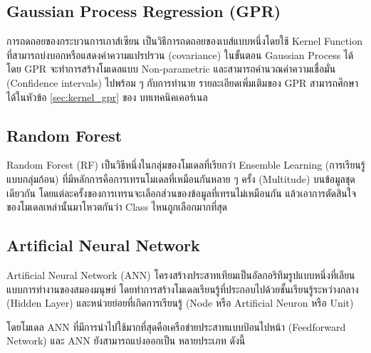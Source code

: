 \subsection{Gaussian Process Regression (GPR)}
\label{sec:gpr}

การถดถอยของกระบวนการเกาส์เซียน เป็นวิธีการถดถอยของเบส์แบบหนึ่งโดยใช้ Kernel Function ที่สามารถบ่งบอกหรือแสดงค่าความแปรปรวน (covariance) 
ในขั้นตอน Gaussian Process ได้\cite{rasmussen2005} โดย GPR จะทำการสร้างโมเดลแบบ Non-parametric และสามารถคำนวณค่าความเชื่อมั่น 
(Confidence intervals) ไปพร้อม ๆ กับการทำนาย รายละเอียดเพิ่มเติมของ GPR สามารถศึกษาได้ในหัวข้อ \ref{sec:kernel_gpr} ของ%
บทเทคนิคเคอร์เนล

\subsection{Random Forest}
\label{sec:rs}

Random Forest (RF) เป็นวิธีหนึ่งในกลุ่มของโมเดลที่เรียกว่า Ensemble Learning (การเรียนรู้แบบกลุ่มก้อน) 
ที่มีหลักการคือการเทรนโมเดลที่เหมือนกันหลาย ๆ ครั้ง (Multitude) บนข้อมูลชุดเดียวกัน โดยแต่ละครั้งของการเทรนจะเลือกส่วนของข้อมูลที่เทรนไม่เหมือนกัน 
แล้วเอาการตัดสินใจของโมเดลเหล่านั้นมาโหวตกันว่า Class ไหนถูกเลือกมากที่สุด\cite{breiman2001,quinlan1986}

\subsection{Artificial Neural Network}
\label{sec:ann}

Artificial Neural Network (ANN) โครงสร้างประสาทเทียมเป็นอัลกอริทึมรูปแบบหนึ่งที่เลียนแบบการทำงานของสมองมนุษย์
โดยทำการสร้างโมเดลเรียนรู้ที่ประกอบไปด้วยชั้นเรียนรู้ระหว่างกลาง (Hidden Layer) และหน่วยย่อยที่เกิดการเรียนรู้ (Node หรือ Artificial Neuron หรือ Unit)

โดยโมเดล ANN ที่มีการนำไปใช้มากที่สุดคือเครือข่ายประสาทแบบป้อนไปหน้า (Feedforward Network) และ ANN ยังสามารถแบ่งออกเป็น
หลายประเภท ดังนี้


